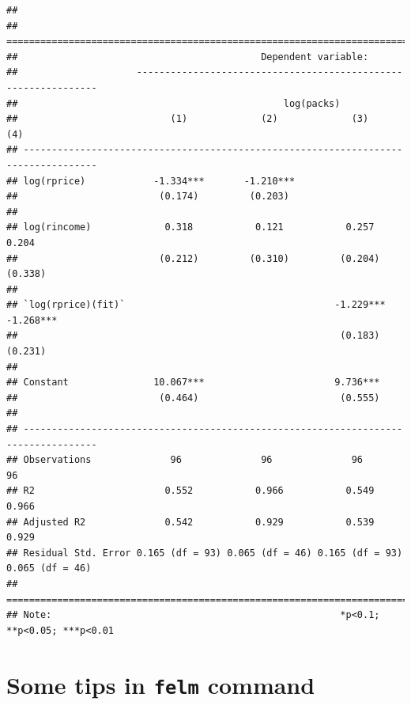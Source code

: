 \documentclass[]{book}
\begin{document}
\begin{verbatim}
## 
## ===================================================================================
##                                           Dependent variable:                      
##                     ---------------------------------------------------------------
##                                               log(packs)                           
##                           (1)             (2)             (3)             (4)      
## -----------------------------------------------------------------------------------
## log(rprice)            -1.334***       -1.210***                                   
##                         (0.174)         (0.203)                                    
##                                                                                    
## log(rincome)             0.318           0.121           0.257           0.204     
##                         (0.212)         (0.310)         (0.204)         (0.338)    
##                                                                                    
## `log(rprice)(fit)`                                     -1.229***       -1.268***   
##                                                         (0.183)         (0.231)    
##                                                                                    
## Constant               10.067***                       9.736***                    
##                         (0.464)                         (0.555)                    
##                                                                                    
## -----------------------------------------------------------------------------------
## Observations              96              96              96              96       
## R2                       0.552           0.966           0.549           0.966     
## Adjusted R2              0.542           0.929           0.539           0.929     
## Residual Std. Error 0.165 (df = 93) 0.065 (df = 46) 0.165 (df = 93) 0.065 (df = 46)
## ===================================================================================
## Note:                                                   *p<0.1; **p<0.05; ***p<0.01
\end{verbatim}

\section{\texorpdfstring{Some tips in \texttt{felm}
command}{Some tips in felm command}}\label{some-tips-in-felm-command}
\end{document}
